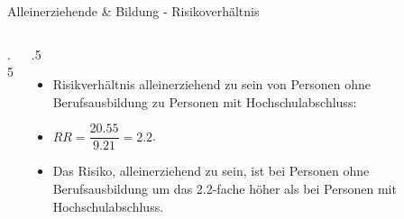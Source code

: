 \documentclass[18pt,handout, aspectratio=169]{beamer}
\begin{document}
\begin{frame}{Alleinerziehende \& Bildung - Risikoverhältnis}
\begin{columns}

\begin{column}{.5\linewidth}
\end{column}

\begin{column}{.5\linewidth}
\begin{itemize}
  \item  Risikverhältnis alleinerziehend zu sein von Personen ohne Berufsausbildung zu Personen mit Hochschulabschluss:\\[.5em]
  \item[] $RR = \dfrac{20.55}{9.21} = 2.2$.\\[.5em] 
  \item[] Das Risiko, alleinerziehend zu sein, ist bei Personen ohne Berufsausbildung um das 2.2-fache höher als bei Personen mit Hochschulabschluss. 
\end{itemize}
\end{column}

\end{columns}
\end{frame}
\end{document}
